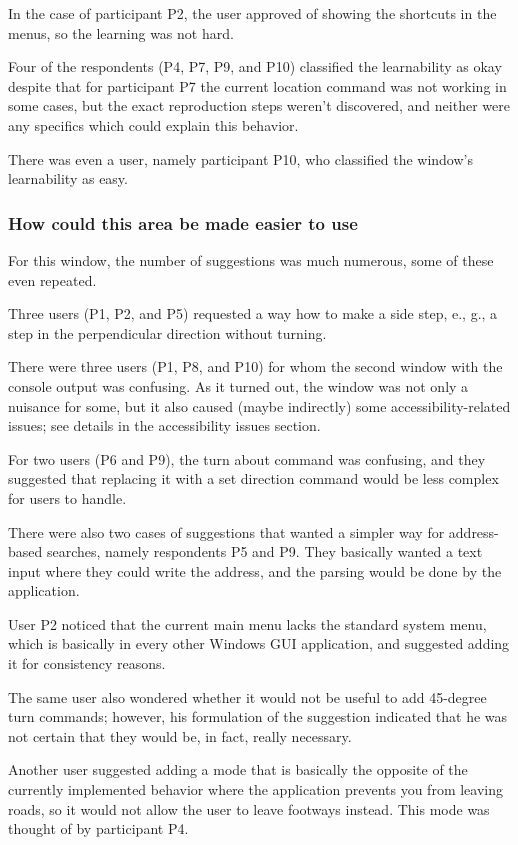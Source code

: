 \documentclass[nolof,digital]{fithesis3}
\begin{document}
In the case of participant P2, the user approved of showing the shortcuts in the menus, so the learning was not hard.

Four of the respondents (P4, P7, P9, and P10) classified the learnability as okay despite that for participant P7 the current location command was not working in some cases, but the exact reproduction steps weren't discovered, and neither were any specifics which could explain this behavior.

There was even a user, namely participant P10, who classified the window's learnability as easy.
\subsubsection{How could this area be made easier to use}
For this window, the number of suggestions was much numerous, some of these even repeated.

Three users (P1, P2, and P5) requested a way how to make a side step, e., g., a step in the perpendicular direction without turning.

There were three users (P1, P8, and P10) for whom the second window with the console output was confusing. As it turned out, the window was not only a nuisance for some, but it also caused (maybe indirectly) some accessibility-related issues; see details in the accessibility issues section.

For two users (P6 and P9), the turn about command was confusing, and they suggested that replacing it with a set direction command would be less complex for users to handle.

There were also two cases of suggestions that wanted a simpler way for address-based searches, namely respondents P5 and P9. They basically wanted a text input where they could write the address, and the parsing would be done by the application.

User P2 noticed that the current main menu lacks the standard system menu, which is basically in every other Windows GUI application, and suggested adding it for consistency reasons.

The same user also wondered whether it would not be useful to add 45-degree turn commands; however, his formulation of the suggestion indicated that he was not certain that they would be, in fact, really necessary.

Another user suggested adding a mode that is basically the opposite of the currently implemented behavior where the application prevents you from leaving roads, so it would not allow the user to leave footways instead. This mode was thought of by participant P4.
\end{document}
